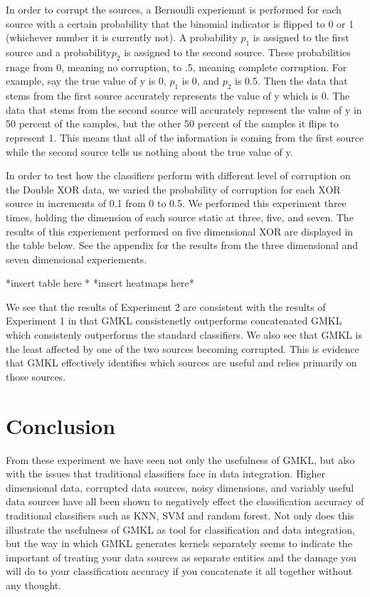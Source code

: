\documentclass{article}
\begin{document}
In order to corrupt the sources, a Bernoulli experiemnt is performed for each source with a certain probability that the binomial indicator is flipped to 0 or 1 (whichever number it is currently not). A probability $p_1$ is assigned to the first source and a probability$ p_2$ is assigned to the second source. These probabilities rnage from 0, meaning no corruption, to .5, meaning complete corruption. For example, say the true value of y is 0, $p_1$ is 0, and $p_2$ is 0.5. Then the data that stems from the first source accurately represents the value of y which is 0. The data that stems from the second source will accurately represent the value of y in 50 percent of the samples, but the other 50 percent of the samples it flips to represent 1. This means that all of the information is coming from the first source while the second source tells us nothing about the true value of y.

In order to test how the classifiers perform with different level of corruption on the Double XOR data, we varied the probability of corruption for each XOR source in increments of 0.1 from 0 to 0.5. We performed this experiment three times, holding the dimension of each source static at three, five, and seven. The results of this experiement performed on five dimensional XOR are displayed in the table below. See the appendix for the results from the three dimensional and seven dimensional experiements.

*insert table here *
*insert heatmaps here*

We see that the results of Experiment 2 are consistent with the results of Experiment 1 in that GMKL consistenetly outperforms concatenated GMKL which consistenly outperforms the standard classifiers. We also see that GMKL is the least affected by one of the two sources becoming corrupted. This is evidence that GMKL effectively identifies which sources are useful and relies primarily on those sources.


\section{Conclusion}
From these experiment we have seen not only the usefulness of GMKL, but also with the issues that traditional classifiers face in data integration. Higher dimensional data, corrupted data sources, noisy dimensions, and variably useful data sources have all been shown to negatively effect the classification accuracy of traditional classifiers such as KNN, SVM and random forest. Not only does this illustrate the usefulness of GMKL as tool for classification and data integration, but the way in which GMKL generates kernels separately seems to indicate the important of treating your data sources as separate entities and the damage you will do to your classification accuracy if you concatenate it all together without any thought. 
\end{document}
